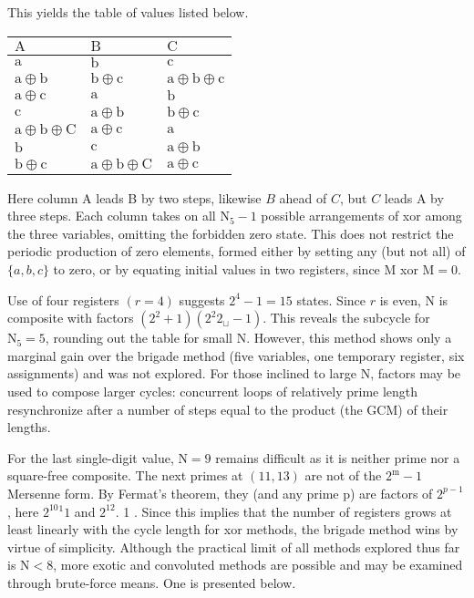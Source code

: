 \begin{CJK}{UTF8}{gbsn}
This yields the table of values listed below.

\begin{center}
\begin{tabular}{lll}
\hline
$\mathrm{A}$ & $\mathrm{B}$ & $\mathrm{C}$ \\
\hline
$\mathrm{a}$ & $\mathrm{b}$ & $\mathrm{c}$ \\
$\mathrm{a} \oplus \mathrm{b}$ & $\mathrm{b} \oplus \mathrm{c}$ & $\mathrm{a} \oplus \mathrm{b} \oplus \mathrm{c}$ \\
$\mathrm{a} \oplus \mathrm{c}$ & $\mathrm{a}$ & $\mathrm{b}$ \\
$\mathrm{c}$ & $\mathrm{a} \oplus \mathrm{b}$ & $\mathrm{b} \oplus \mathrm{c}$ \\
$\mathrm{a} \oplus \mathrm{b} \oplus \mathrm{C}$ & $\mathrm{a} \oplus \mathrm{c}$ & $\mathrm{a}$ \\
$\mathrm{b}$ & $\mathrm{c}$ & $\mathrm{a} \oplus \mathrm{b}$ \\
$\mathrm{b} \oplus \mathrm{c}$ & $\mathrm{a} \oplus \mathrm{b} \oplus \mathrm{C}$ & $\mathrm{a} \oplus \mathrm{c}$ \\
\hline
\end{tabular}
\end{center}

Here column A leads B by two steps, likewise $B$ ahead of $C$, but $C$ leads A by three steps. Each column takes on all $\mathrm{N}_{5}-1$ possible arrangements of xor among the three variables, omitting the forbidden zero state. This does not restrict the periodic production of zero elements, formed either by setting any (but not all) of $\{a, b, c\}$ to zero, or by equating initial values in two registers, since $\mathrm{M}$ xor $\mathrm{M}=0$.

Use of four registers $(r=4)$ suggests $2^{4}-1=15$ states. Since $r$ is even, $\mathrm{N}$ is composite with factors $\left(2^{2}+1\right)\left(2^{2} 2_{\sqcup}-1\right)$. This reveals the subcycle for $\mathrm{N}_{5}=5$, rounding out the table for small $\mathrm{N}$. However, this method shows only a marginal gain over the brigade method (five variables, one temporary register, six assignments) and was not explored. For those inclined to large $\mathrm{N}$, factors may be used to compose larger cycles: concurrent loops of relatively prime length resynchronize after a number of steps equal to the product (the GCM) of their lengths.

For the last single-digit value, $\mathrm{N}=9$ remains difficult as it is neither prime nor a square-free composite. The next primes at $(11,13)$ are not of the $2^{\mathrm{m}}-1$ Mersenne form. By Fermat's theorem, they (and any prime p) are factors of $2^{p-1}$, here $2^{10}{ }^{1} 1$ and $2^{12}$. 1 . Since this implies that the number of registers grows at least linearly with the cycle length for xor methods, the brigade method wins by virtue of simplicity. Although the practical limit of all methods explored thus far is $\mathrm{N}<8$, more exotic and convoluted methods are possible and may be examined through brute-force means. One is presented below.


\end{CJK}
